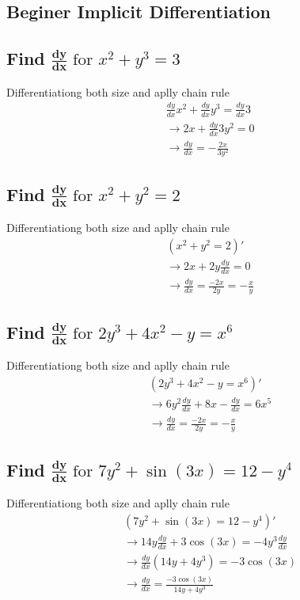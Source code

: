 \documentclass{article}
\begin{document}
\begin{multicols}{2}

\section{Beginer Implicit Differentiation}

\subsection{Find $\mathbf{\frac{dy}{dx}} \text{ for } x^2+y^3=3$}
\noindent Differentiationg both size and aplly chain rule
\begin{align*}
    & \frac{dy}{dx}x^2 + \frac{dy}{dx}y^3 = \frac{dy}{dx}3\\
    &\rightarrow 2x + \frac{dy}{dx}3y^2 = 0\\
    &\rightarrow \frac{dy}{dx} = -\frac{2x}{3y^2}
\end{align*}

\subsection{Find $\mathbf{\frac{dy}{dx}} \text{ for } x^2+y^2=2$}
\noindent Differentiationg both size and aplly chain rule
\begin{align*}
    &(x^2+y^2=2)' \\
    &\rightarrow 2x+2y\frac{dy}{dx}=0 \\
    &\rightarrow \frac{dy}{dx} = \frac{-2x}{2y} = -\frac{x}{y}
\end{align*}

\subsection{Find $\mathbf{\frac{dy}{dx}} \text{ for } 2y^3+4x^2-y=x^6$}
\noindent Differentiationg both size and aplly chain rule
\begin{align*}
    &(2y^3+4x^2-y=x^6)' \\
    &\rightarrow 6y^2\frac{dy}{dx} +8x- \frac{dy}{dx}=6x^5 \\
    &\rightarrow \frac{dy}{dx} = \frac{-2x}{2y} = -\frac{x}{y}
\end{align*}

\subsection{Find $\mathbf{\frac{dy}{dx}} \text{ for } 7y^2+\sin(3x)=12-y^4$}
\noindent Differentiationg both size and aplly chain rule
\begin{align*}
    &(7y^2+\sin(3x)=12-y^4)' \\
    &\rightarrow 14y\frac{dy}{dx} + 3\cos(3x)=-4y^3\frac{dy}{dx} \\
    &\rightarrow \frac{dy}{dx}(14y+4y^3)=-3\cos(3x) \\
    &\rightarrow \frac{dy}{dx}= \frac{-3\cos(3x)}{14y+4y^3}
\end{align*}


\end{multicols}
\end{document}
